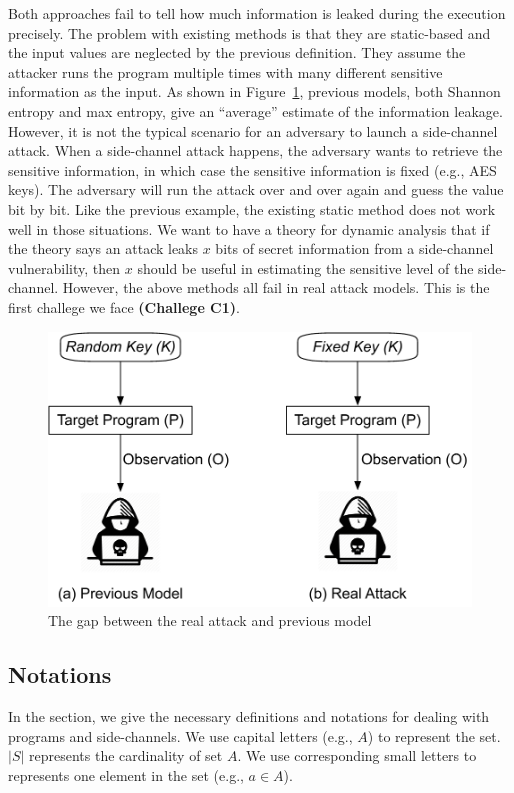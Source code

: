 Both approaches fail to tell how much information is leaked during the execution
precisely. The problem with existing methods is that they are static-based and
the input values are neglected by the previous definition. They assume the
attacker runs the program multiple times with many different sensitive
information as the input. As shown in Figure~\ref{fig:gap}, previous models,
both Shannon entropy and max entropy, give an ``average'' estimate of the
information leakage. However, it is not the typical scenario for an adversary to
launch a side-channel attack. When a side-channel attack happens, the adversary
wants to retrieve the sensitive information, in which case the sensitive
information is fixed (e.g., AES keys). The adversary will run the attack over
and over again and guess the value bit by bit. Like the previous example, the
existing static method does not work well in those situations. We want to have a
theory for dynamic analysis that if the theory says an attack leaks $x$ bits of
secret information from a side-channel vulnerability, then $x$ should be useful
in estimating the sensitive level of the side-channel. However, the above methods
all fail in real attack models. This is the first challege we face
\textbf{(Challege C1)}.

\begin{figure}
    \centering
    \includegraphics[width=.8\columnwidth]{./figures/RA.pdf}
    \caption{The gap between the real attack and previous model}\label{fig:gap}
\end{figure}


\subsection{Notations}
In the section, we give the necessary definitions and notations for dealing with
programs and side-channels. We use capital letters (e.g., $A$) to represent the
set. $|S|$ represents the cardinality of set $A$. We use corresponding small
letters to represents one element in the set (e.g., $a \in A$).


